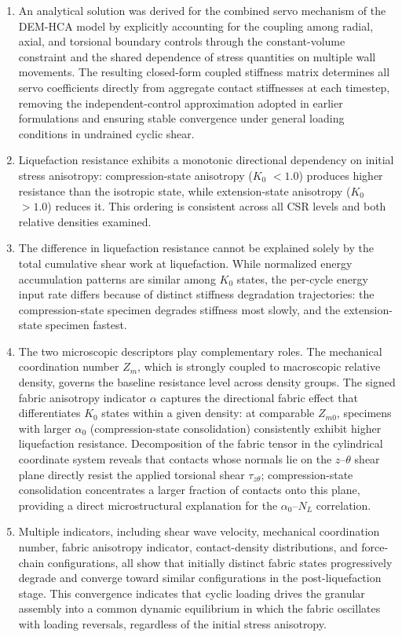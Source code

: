 \documentclass[a4paper,fleqn]{cas-sc}
\newcommand{\Kzero}{\ensuremath{K_0}}
\newcommand{\Zm}{\ensuremath{Z_m}}
\begin{document}
\begin{enumerate}
\item An analytical solution was derived for the combined servo mechanism of the DEM-HCA model by explicitly accounting for the coupling among radial, axial, and torsional boundary controls through the constant-volume constraint and the shared dependence of stress quantities on multiple wall movements. The resulting closed-form coupled stiffness matrix determines all servo coefficients directly from aggregate contact stiffnesses at each timestep, removing the independent-control approximation adopted in earlier formulations and ensuring stable convergence under general loading conditions in undrained cyclic shear.

\item Liquefaction resistance exhibits a monotonic directional dependency on initial stress anisotropy: compression-state anisotropy (\Kzero{} $< 1.0$) produces higher resistance than the isotropic state, while extension-state anisotropy (\Kzero{} $> 1.0$) reduces it. This ordering is consistent across all CSR levels and both relative densities examined.

\item The difference in liquefaction resistance cannot be explained solely by the total cumulative shear work at liquefaction. While normalized energy accumulation patterns are similar among \Kzero{} states, the per-cycle energy input rate differs because of distinct stiffness degradation trajectories: the compression-state specimen degrades stiffness most slowly, and the extension-state specimen fastest.

\item The two microscopic descriptors play complementary roles. The mechanical coordination number \Zm{}, which is strongly coupled to macroscopic relative density, governs the baseline resistance level across density groups. The signed fabric anisotropy indicator $\alpha$ captures the directional fabric effect that differentiates \Kzero{} states within a given density: at comparable $Z_{m0}$, specimens with larger $\alpha_0$ (compression-state consolidation) consistently exhibit higher liquefaction resistance. Decomposition of the fabric tensor in the cylindrical coordinate system reveals that contacts whose normals lie on the $z$--$\theta$ shear plane directly resist the applied torsional shear $\tau_{z\theta}$; compression-state consolidation concentrates a larger fraction of contacts onto this plane, providing a direct microstructural explanation for the $\alpha_0$--$N_L$ correlation.

\item Multiple indicators, including shear wave velocity, mechanical coordination number, fabric anisotropy indicator, contact-density distributions, and force-chain configurations, all show that initially distinct fabric states progressively degrade and converge toward similar configurations in the post-liquefaction stage. This convergence indicates that cyclic loading drives the granular assembly into a common dynamic equilibrium in which the fabric oscillates with loading reversals, regardless of the initial stress anisotropy.

\end{enumerate}
 
\end{document}
